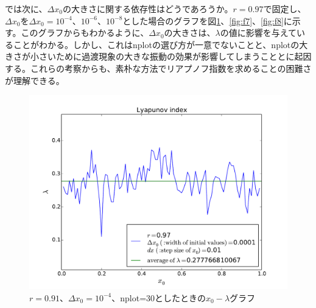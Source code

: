\documentclass{jsarticle}
\begin{document}
\begin{enumerate}
\begin{enumerate}
                では次に、$\Delta x_{0}$の大きさに関する依存性はどうであろうか。$r=0.97$で固定し、$\Delta x_{0}$を$\Delta x_{0} = 10^{-4}$、$10^{-6}$、$10^{-8}$とした場合のグラフを図\ref{fig:f6}、\ref{fig:f7}、\ref{fig:f8}に示す。このグラフからもわかるように、$\Delta x_{0}$の大きさは、$\lambda$の値に影響を与えていることがわかる。しかし、これはnplotの選び方が一意でないことと、nplotの大きさが小さいために過渡現象の大きな振動の効果が影響してしまうこととに起因する。これらの考察からも、素朴な方法でリアプノフ指数を求めることの困難さが理解できる。
                \begin{figure}[H]   
                    \begin{center}
                        \includegraphics[width=12.5cm]{figure_9.pdf}
                        \caption{$r=0.91$、$\Delta x_{0}=10^{-4}$、nplot=30としたときの$x_{0} - \lambda$グラフ}
                        \label{fig:f6}
                    \end{center}
                \end{figure}
                

\end{enumerate}
\end{enumerate}
\end{document}

